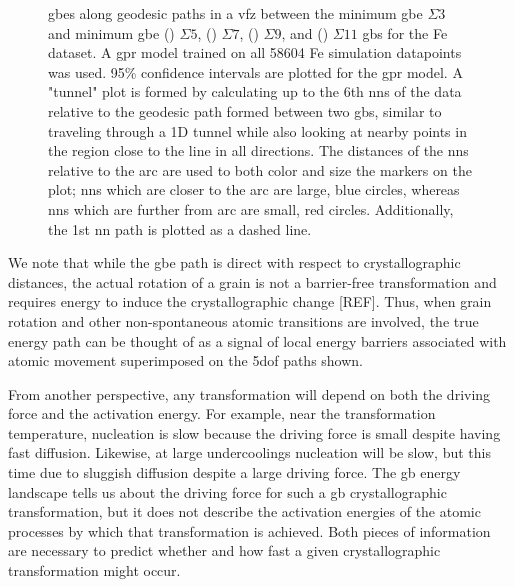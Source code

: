 \documentclass[final,twocolumn,12pt]{elsarticle}
\begin{document}
\begin{figure}[!htb]
\begin{subfigure}[b]{0.4\textwidth}
			\caption{}
			\label{fig:tunnel-3-11-kim}
		\end{subfigure}
		\caption{\Glspl{gbe} along geodesic paths in a \gls{vfz} between the minimum \gls{gbe} $\Sigma3$  and minimum \gls{gbe} () $\Sigma5$, () $\Sigma7$, () $\Sigma9$, and () $\Sigma11$ \glspl{gb} for the Fe \citet{kimPhasefieldModeling3D2014} dataset. A \gls{gpr} model trained on all \num{58604} Fe \citet{kimPhasefieldModeling3D2014} simulation datapoints was used. 95\% confidence intervals are plotted for the \gls{gpr} model. A "tunnel" plot is formed by calculating up to the 6th \glspl{nn} of the \inpt{} data relative to the geodesic path formed between two \glspl{gb}, similar to traveling through a 1D tunnel while also looking at nearby points in the region close to the line in all directions. The distances of the \glspl{nn} relative to the arc are used to both color and size the markers on the plot; \glspl{nn} which are closer to the arc are large, blue circles, whereas \glspl{nn} which are further from arc are small, red circles. Additionally, the 1st \gls{nn} path is plotted as a dashed line. }
		\label{fig:sigma-tunnels-kim}
	\end{figure}
	
     We note that while the \gls{gbe} path is direct with respect to crystallographic distances, the actual rotation of a grain is not a barrier-free transformation and requires energy to induce the crystallographic change [REF]. Thus, when grain rotation and other non-spontaneous atomic transitions are involved, the true energy path can be thought of as a signal of local energy barriers associated with atomic movement superimposed on the \gls{5dof} paths shown.
     
     From another perspective, any transformation will depend on both the driving force and the activation energy. For example, near the transformation temperature, nucleation is slow because the driving force is small despite having fast diffusion. Likewise, at large undercoolings nucleation will be slow, but this time due to sluggish diffusion despite a large driving force. The \gls{gb} energy landscape tells us about the driving force for such a \gls{gb} crystallographic transformation, but it does not describe the activation energies of the atomic processes by which that transformation is achieved. Both pieces of information are necessary to predict whether and how fast a given crystallographic transformation might occur.
\end{document}
